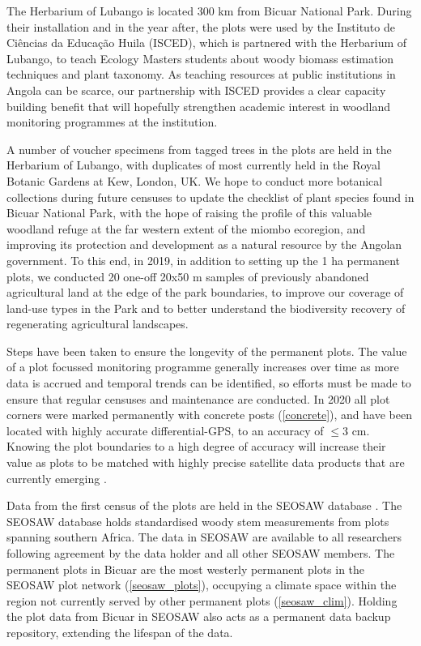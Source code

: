 \begin{refsection}
The Herbarium of Lubango is located \textapprox{}300 km from Bicuar National Park. During their installation and in the year after, the plots were used by the Instituto de Ci\^{e}ncias da Educa\c{c}\~{a}o Huila (ISCED), which is partnered with the Herbarium of Lubango, to teach Ecology Masters students about woody biomass estimation techniques and plant taxonomy. As teaching resources at public institutions in Angola can be scarce, our partnership with ISCED provides a clear capacity building benefit that will hopefully strengthen academic interest in woodland monitoring programmes at the institution.

A number of voucher specimens from tagged trees in the plots are held in the Herbarium of Lubango, with duplicates of most currently held in the Royal Botanic Gardens at Kew, London, UK. We hope to conduct more botanical collections during future censuses to update the checklist of plant species found in Bicuar National Park, with the hope of raising the profile of this valuable woodland refuge at the far western extent of the miombo ecoregion, and improving its protection and development as a natural resource by the Angolan government. To this end, in 2019, in addition to setting up the 1 ha permanent plots, we conducted 20 one-off 20x50 m samples of previously abandoned agricultural land at the edge of the park boundaries, to improve our coverage of land-use types in the Park and to better understand the biodiversity recovery of regenerating agricultural landscapes.

Steps have been taken to ensure the longevity of the permanent plots. The value of a plot focussed monitoring programme generally increases over time as more data is accrued and temporal trends can be identified, so efforts must be made to ensure that regular censuses and maintenance are conducted. In 2020 all plot corners were marked permanently with concrete posts (\autoref{concrete}), and have been located with highly accurate differential-GPS, to an accuracy of $\le$3 cm. Knowing the plot boundaries to a high degree of accuracy will increase their value as plots to be matched with highly precise satellite data products that are currently emerging \citep{Exbrayat2019, GeorgeChacon2019, Wagner2018}. 

Data from the first census of the plots are held in the SEOSAW database \citep{SEOSAW2020}. The SEOSAW database holds standardised woody stem measurements from plots spanning southern Africa. The data in SEOSAW are available to all researchers following agreement by the data holder and all other SEOSAW members. The permanent plots in Bicuar are the most westerly permanent plots in the SEOSAW plot network (\autoref{seosaw_plots}), occupying a climate space within the region not currently served by other permanent plots (\autoref{seosaw_clim}). Holding the plot data from Bicuar in SEOSAW also acts as a permanent data backup repository, extending the lifespan of the data.


\end{refsection}
